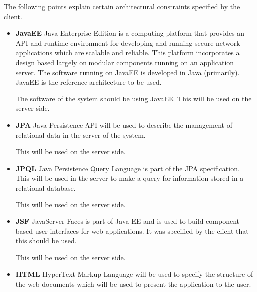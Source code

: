 

\begin{flushleft}

The following points explain certain architectural constraints specified by the client. 

\begin{itemize}
	\item\textbf{JavaEE}
	\newline
	Java Enterprise Edition is a computing platform that provides an API and runtime environment for developing and running secure network applications which are scalable and reliable. 			This platform incorporates a design based largely on modular components running on an application server. The software running on JavaEE is developed in Java (primarily). JavaEE is 			the reference architecture to be used.
	\newline

	The software of the system should be using JavaEE. This will be used on the server side.

	\item\textbf{JPA}
	\newline
	Java Persistence API will be used to describe the management of relational data in the server of the system.
	\newline

	This will be used on the server side.

	\item\textbf{JPQL}
	\newline
	Java Persistence Query Language is part of the JPA specification. This will be used in the server to make a query for information stored in a relational database.
	\newline

	This will be used on the server side.

	\item\textbf{JSF}
	\newline
	JavaServer Faces is part of Java EE and is used to build component- based user interfaces for web applications. It was specified by the client that this should be used.
	\newline

	This will be used on the server side.

	\item\textbf{HTML}
	\newline
	HyperText Markup Language will be used to specify the structure of the web documents which will be used to present the application to the user.
	\newline


\end{itemize}
\end{flushleft}
